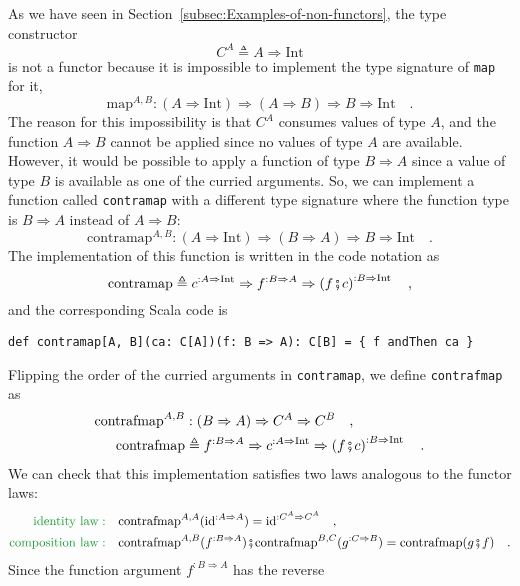 As we have seen in Section~\ref{subsec:Examples-of-non-functors},
the type constructor
\[
C^{A}\triangleq A\Rightarrow\text{Int}
\]
is not a functor because it is impossible to implement the type signature
of \lstinline!map! for it,
\[
\text{map}^{A,B}:\left(A\Rightarrow\text{Int}\right)\Rightarrow\left(A\Rightarrow B\right)\Rightarrow B\Rightarrow\text{Int}\quad.
\]
The reason for this impossibility is that $C^{A}$ consumes values
of type $A$, and the function $A\Rightarrow B$ cannot be applied
since no values of type $A$ are available. However, it would be possible
to apply a function of type $B\Rightarrow A$ since a value of type
$B$ is available as one of the curried arguments. So, we can implement
a function called \lstinline!contramap! with a different type signature
where the function type is $B\Rightarrow A$ instead of $A\Rightarrow B$:
\[
\text{contramap}^{A,B}:\left(A\Rightarrow\text{Int}\right)\Rightarrow\left(B\Rightarrow A\right)\Rightarrow B\Rightarrow\text{Int}\quad.
\]
The implementation of this function is written in the code notation
as
\[
\text{contramap}\triangleq c^{:A\Rightarrow\text{Int}}\Rightarrow f^{:B\Rightarrow A}\Rightarrow\left(f\bef c\right)^{:B\Rightarrow\text{Int}}\quad,
\]
and the corresponding Scala code is
\begin{lstlisting}
def contramap[A, B](ca: C[A])(f: B => A): C[B] = { f andThen ca }
\end{lstlisting}
Flipping the order of the curried arguments in \lstinline!contramap!,
we define \lstinline!contrafmap! as
\begin{align}
\text{contrafmap}^{A,B} & :\left(B\Rightarrow A\right)\Rightarrow C^{A}\Rightarrow C^{B}\quad,\nonumber \\
\text{contrafmap} & \triangleq f^{:B\Rightarrow A}\Rightarrow c^{:A\Rightarrow\text{Int}}\Rightarrow\left(f\bef c\right)^{:B\Rightarrow\text{Int}}\quad.\label{eq:f-example-1-contrafmap}
\end{align}
We can check that this implementation satisfies two laws analogous
to the functor laws:
\begin{align*}
{\color{greenunder}\text{identity law}:}\quad & \text{contrafmap}^{A,A}(\text{id}^{:A\Rightarrow A})=\text{id}^{:C^{A}\Rightarrow C^{A}}\quad,\\
{\color{greenunder}\text{composition law}:}\quad & \text{contrafmap}^{A,B}(f^{:B\Rightarrow A})\bef\text{contrafmap}^{B,C}(g^{:C\Rightarrow B})=\text{contrafmap}(g\bef f)\quad.
\end{align*}
Since the function argument $f^{:B\Rightarrow A}$ has the reverse
